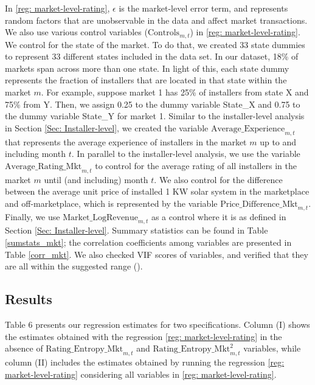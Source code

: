 \documentclass[mnsc,blindrev]{informs3}
\begin{document}
	
	In \eqref{reg: market-level-rating}, $\epsilon$ is the market-level error term, and represents random factors that are unobservable in the data and affect market transactions. We also use various control variables ($\text{Controls}_{m,t}$) in \eqref{reg: market-level-rating}. We control for the state of the market. To do that, we created 33 state dummies to represent 33 different states included in the data set. In our dataset, 18\% of markets span across more than one state.  In light of this, each state dummy represents the fraction of installers that are located in that state within the market $m$. For example, suppose market 1 has 25\% of installers from state X and 75\% from Y. Then, we assign 0.25 to the dummy variable State\_X and 0.75 to the dummy variable State\_Y for market 1.  Similar to the installer-level analysis in Section \ref{Sec: Installer-level}, we created the variable $\text{Average\_Experience}_{m,t}$ that represents the average experience of installers in the market $m$ up to and including month $t$. In parallel to the installer-level analysis, we use the variable $\text{Average\_Rating\_Mkt}_{m,t}$ to control for the average rating of all installers in the market $m$ until (and including) month $t$. We also control for the difference between the average unit price of installed 1 KW solar system in the marketplace and off-marketplace, which is represented by the variable $\text{Price\_Difference\_Mkt}_{m,t}$. Finally, we use $\text{Market\_LogRevenue}_{m,t}$ as a control where it is as defined in Section \ref{Sec: Installer-level}. Summary statistics can be found in Table \ref{sumstats_mkt}; the correlation coefficients among variables are presented in Table \ref{corr_mkt}.  We also checked VIF scores of variables, and verified that they are all within the suggested range (\cite{hairmultivariate}).


	
	
	
	\subsection{Results}
	
	
	Table 6 presents our regression estimates for two specifications. Column (I) shows the estimates obtained with the regression \eqref{reg: market-level-rating} in the absence of $\text{Rating\_Entropy\_Mkt}_{m,t}$ and $\text{Rating\_Entropy\_Mkt}^2_{m,t}$ variables, while column (II) includes the estimates obtained by running the regression \eqref{reg: market-level-rating} considering all variables in \eqref{reg: market-level-rating}.
	
\end{document}
